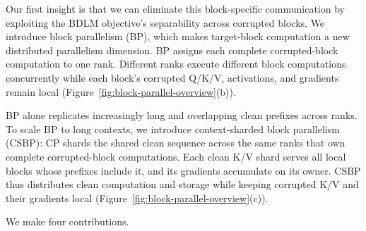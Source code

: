Our first insight is that we can eliminate this block-specific communication by
exploiting the BDLM objective's separability across corrupted blocks. We
introduce block parallelism (BP), which makes target-block computation a new
distributed parallelism dimension. BP assigns each complete corrupted-block
computation to one rank. Different ranks execute different block computations
concurrently while each block's corrupted Q/K/V, activations, and gradients
remain local (Figure~\ref{fig:block-parallel-overview}(b)).

BP alone replicates increasingly long and overlapping clean prefixes across
ranks. To scale BP to long contexts, we introduce context-sharded
block parallelism (CSBP): CP shards the shared clean sequence across the same
ranks that own complete corrupted-block computations. Each clean K/V shard
serves all local blocks whose prefixes include it, and its gradients accumulate
on its owner. CSBP thus distributes clean computation and storage while keeping
corrupted K/V and their gradients local
(Figure~\ref{fig:block-parallel-overview}(c)).

We make four contributions.

